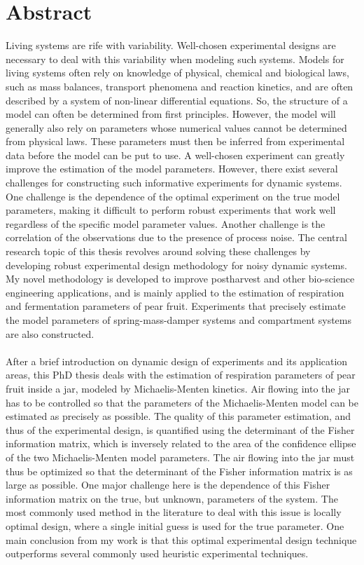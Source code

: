 \chapter*{Abstract}
Living systems are rife with variability. Well-chosen experimental designs are necessary to deal with this variability when modeling such systems. Models for living systems often rely on knowledge of physical, chemical and biological laws, such as mass balances, transport phenomena and reaction kinetics, and are often described by a system of non-linear differential equations. So, the structure of a model can often be determined from first principles. However, the model will generally also rely on parameters whose numerical values cannot be determined from physical laws. These parameters must then be inferred from experimental data before the model can be put to use. A well-chosen experiment can greatly improve the estimation of the model parameters. {\color{red}However,} there exist several challenges for constructing such informative experiments for dynamic systems. One challenge is the dependence of the optimal experiment on the true model parameters, making it difficult to perform robust experiments that work well regardless of the specific model parameter values. Another challenge is the correlation of the observations due to the presence of process noise. The central research topic of this thesis revolves around solving these challenges by developing robust experimental design methodology for noisy dynamic systems. My novel methodology is developed to improve postharvest {\color{red}and other bio-science engineering applications}, and is mainly applied to the estimation of respiration and fermentation parameters of pear fruit. {\color{red}Experiments that precisely estimate the model parameters of spring-mass-damper systems and compartment systems are also constructed}. 
\\
\\
{\color{red}After a brief introduction on dynamic design of experiments and its application areas,} this PhD thesis deals with the estimation of respiration parameters of pear fruit inside a jar, modeled by Michaelis-Menten kinetics. Air flowing into the jar has to be controlled so that the parameters of the Michaelis-Menten model can be estimated as precisely as possible. The quality of this parameter estimation, and thus of the experimental design, is quantified using the determinant of the Fisher information matrix, which is inversely related to the area of the confidence ellipse of the two Michaelis-Menten model parameters. The air flowing into the jar must thus be optimized so that the determinant of the Fisher information matrix is as large as possible. One major challenge here is the dependence of this Fisher information matrix on the true, but unknown, parameters of the system. The most commonly used method in the literature to deal with this issue is locally optimal design, where a single initial guess is used for the true parameter. One main conclusion from my work is that this optimal experimental design technique outperforms several commonly used heuristic experimental techniques.
